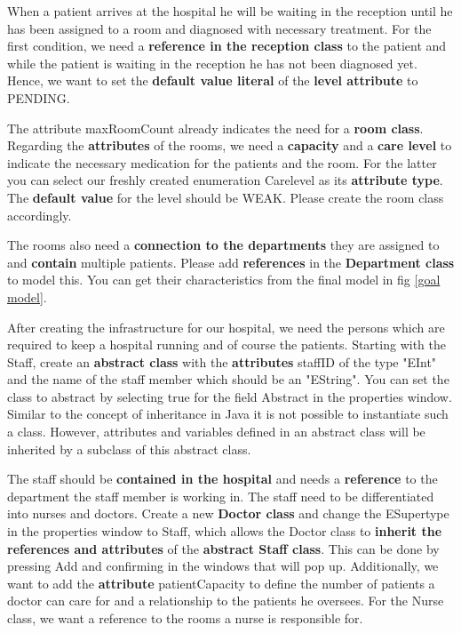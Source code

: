 When a patient arrives at the hospital he will be waiting in the reception until he has been assigned to a room and diagnosed with necessary treatment. For the first condition, we need a \textbf{reference in the reception class} to the patient and while the patient is waiting in the reception he has not been diagnosed yet. Hence, we want to set the \textbf{default value literal} of the \textbf{level attribute} to \textsf{PENDING}.\newline

The attribute \textsf{maxRoomCount} already indicates the need for a \textbf{room class}. Regarding the \textbf{attributes} of the rooms, we need a \textbf{capacity} and a \textbf{care level} to indicate the necessary medication for the patients and the room.
For the latter you can select our freshly created enumeration \textsf{Carelevel} as its \textbf{attribute type}. The \textbf{default value} for the level should be \textsf{WEAK}.
Please create the room class accordingly.\newline

The rooms also need a \textbf{connection to the departments} they are assigned to and \textbf{contain} multiple patients. Please add \textbf{references} in the \textbf{Department class} to model this. You can get their characteristics from the final model in fig \ref{goal model}.\newline

After creating the infrastructure for our hospital, we need the persons which are required to keep a hospital running and of course the patients. Starting with the Staff, create an \textbf{abstract class} with the \textbf{attributes} \textsf{staffID} of the type "EInt" and the \textsf{name} of the staff member which should be an "EString". You can set the class to abstract by selecting \textsf{true} for the field \textsf{Abstract} in the properties window.\newline
Similar to the concept of inheritance in Java it is not possible to instantiate such a class. However, attributes and variables defined in an abstract class will be inherited by a subclass of this abstract class.\newline

The staff should be \textbf{contained in the hospital} and needs a \textbf{reference} to the department the staff member is working in.
The staff need to be differentiated into nurses and doctors. Create a new \textbf{Doctor class} and change the \textsf{ESupertype} in the properties window to \textsf{Staff}, which allows the Doctor class to \textbf{inherit the references and attributes} of the \textbf{abstract Staff class}. This can be done by pressing \textsf{Add} and confirming in the windows that will pop up.
Additionally, we want to add the \textbf{attribute} \textsf{patientCapacity} to define the number of patients a doctor can care for and a relationship to the patients he oversees.\newline
For the Nurse class, we want a reference to the rooms a nurse is \textsf{responsible} for. 

